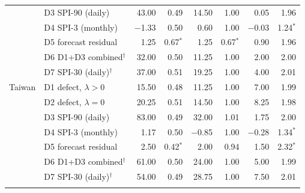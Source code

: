 \begin{table}[h]
\begin{tabular*}{\textwidth}{@{\extracolsep\fill}llrrrrrr}
 & D3 SPI-90 (daily) & 43.00 & 0.49 & 14.50 & 1.00 & 0.05 & 1.96 \\
 & D4 SPI-3 (monthly) & $-$1.33 & 0.50 & 0.60 & 1.00 & $-$0.03 & 1.24$^{\ast}$ \\
 & D5 forecast residual & 1.25 & 0.67$^{\ast}$ & 1.25 & 0.67$^{\ast}$ & 0.90 & 1.96 \\
 & D6 D1+D3 combined$^{\dagger}$ & 32.00 & 0.50 & 11.25 & 1.00 & 2.00 & 2.00 \\
 & D7 SPI-30 (daily)$^{\dagger}$ & 37.00 & 0.51 & 19.25 & 1.00 & 4.00 & 2.01 \\
\midrule
Taiwan & D1 defect, $\lambda>0$ & 15.50 & 0.48 & 11.25 & 1.00 & 7.00 & 1.99 \\
 & D2 defect, $\lambda=0$ & 20.25 & 0.51 & 14.50 & 1.00 & 8.25 & 1.98 \\
 & D3 SPI-90 (daily) & 83.00 & 0.49 & 32.00 & 1.01 & 1.75 & 2.00 \\
 & D4 SPI-3 (monthly) & 1.17 & 0.50 & $-$0.85 & 1.00 & $-$0.28 & 1.34$^{\ast}$ \\
 & D5 forecast residual & 2.50 & 0.42$^{\ast}$ & 2.00 & 0.94 & 1.50 & 2.32$^{\ast}$ \\
 & D6 D1+D3 combined$^{\dagger}$ & 61.00 & 0.50 & 24.00 & 1.00 & 5.00 & 1.99 \\
 & D7 SPI-30 (daily)$^{\dagger}$ & 54.00 & 0.49 & 28.75 & 1.00 & 7.50 & 2.01 \\
\botrule
\end{tabular*}
\end{table}
